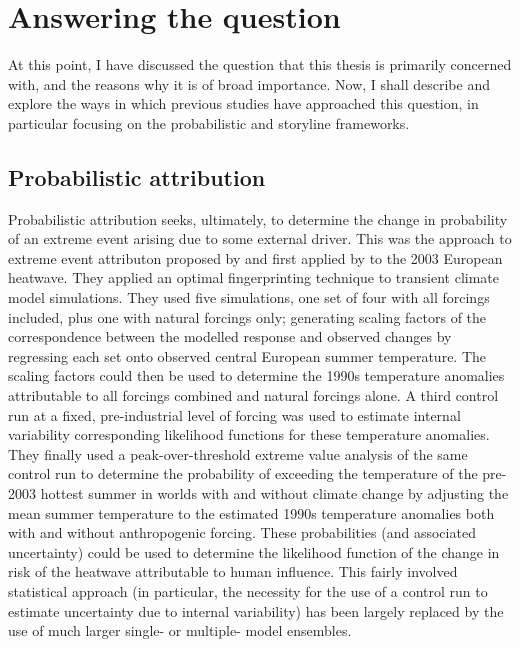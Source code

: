 \section{Answering the question}

  At this point, I have discussed the question that this thesis is primarily concerned with, and the reasons why it is of broad importance. Now, I shall describe and explore the ways in which previous studies have approached this question, in particular focusing on the probabilistic \citep[often ``conventional'',][]{stott_human_2004} and storyline \citep{hoerling_anatomy_2013} frameworks. 

  \subsection{Probabilistic attribution}

    Probabilistic attribution seeks, ultimately, to determine the change in probability of an extreme event arising due to some external driver. This was the approach to extreme event attributon proposed by \citet{allen_liability_2003} and first applied by \citet{stott_human_2004} to the 2003 European heatwave. They applied an optimal fingerprinting technique \citep{hasselmann_optimal_1993,hasselmann_multi-pattern_1997} to transient climate model simulations. They used five simulations, one set of four with all forcings included, plus one with natural forcings only; generating scaling factors of the correspondence between the modelled response and observed changes by regressing each set onto observed central European summer temperature. The scaling factors could then be used to determine the 1990s temperature anomalies attributable to all forcings combined and natural forcings alone. A third control run at a fixed, pre-industrial level of forcing was used to estimate internal variability corresponding likelihood functions for these temperature anomalies. They finally used a peak-over-threshold extreme value analysis of the same control run to determine the probability of exceeding the temperature of the pre-2003 hottest summer in worlds with and without climate change by adjusting the mean summer temperature to the estimated 1990s temperature anomalies both with and without anthropogenic forcing. These probabilities (and associated uncertainty) could be used to determine the likelihood function of the change in risk of the heatwave attributable to human influence. This fairly involved statistical approach (in particular, the necessity for the use of a control run to estimate uncertainty due to internal variability) has been largely replaced by the use of much larger single- or multiple- model ensembles.

